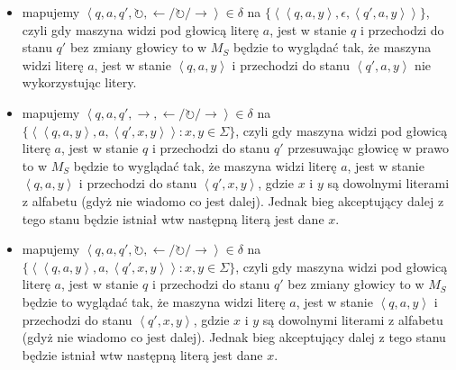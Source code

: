 \documentclass{article}
\theoremstyle{definition}
\theoremstyle{remark}
\begin{document}
\begin{itemize}
\begin{itemize}
\item mapujemy \( \left<q, a, q', \circlearrowright, \leftarrow / \circlearrowright / \rightarrow \right> \in \delta\) na \( \{ \left< \left<q,a,y\right>, \epsilon, \left<q',a,y\right> \right>\} \), czyli gdy maszyna widzi pod głowicą literę \(a\), jest w stanie \(q\) i przechodzi do stanu \(q'\) bez zmiany głowicy to w \(M_S\) będzie to wyglądać tak, że maszyna widzi literę \(a\), jest w stanie \(\left<q,a,y\right>\) i przechodzi do stanu \(\left<q',a,y\right>\) nie wykorzystując litery.
\item mapujemy \( \left<q, a, q', \rightarrow, \leftarrow / \circlearrowright / \rightarrow \right> \in \delta\) na \( \{ \left< \left<q,a,y\right>, a, \left<q',x,y\right> \right>: x,y \in \Sigma \} \), czyli gdy maszyna widzi pod głowicą literę \(a\), jest w stanie \(q\) i przechodzi do stanu \(q'\) przesuwając głowicę w prawo to w \(M_S\) będzie to wyglądać tak, że maszyna widzi literę \(a\), jest w stanie \(\left<q,a,y\right>\) i przechodzi do stanu \(\left<q',x,y\right>\), gdzie \(x\) i \(y\) są dowolnymi literami z alfabetu (gdyż nie wiadomo co jest dalej). Jednak bieg akceptujący dalej z tego stanu będzie istniał wtw następną literą jest dane \(x\).
\item mapujemy \( \left<q, a, q', \circlearrowright, \leftarrow / \circlearrowright / \rightarrow \right> \in \delta\) na \( \{ \left< \left<q,a,y\right>, a, \left<q',x,y\right> \right>: x,y \in \Sigma \} \), czyli gdy maszyna widzi pod głowicą literę \(a\), jest w stanie \(q\) i przechodzi do stanu \(q'\) bez zmiany głowicy to w \(M_S\) będzie to wyglądać tak, że maszyna widzi literę \(a\), jest w stanie \(\left<q,a,y\right>\) i przechodzi do stanu \(\left<q',x,y\right>\), gdzie \(x\) i \(y\) są dowolnymi literami z alfabetu (gdyż nie wiadomo co jest dalej). Jednak bieg akceptujący dalej z tego stanu będzie istniał wtw następną literą jest dane \(x\).
\end{itemize}
\end{itemize}
\end{document}
